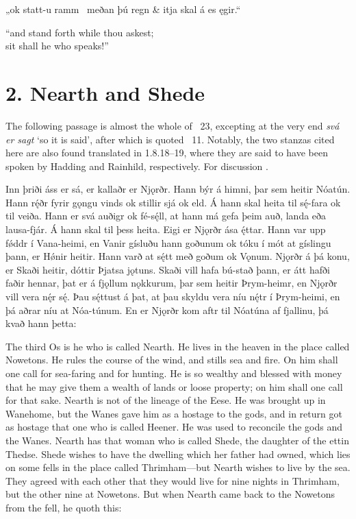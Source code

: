 \bvg\bva„ok statt-u ramm \hld\ meðan þú regn &
\ind {}itja skal á es ęgir.“\eva

\bvb “and stand forth while thou askest; \\
\ind sit shall he who speaks!”\evb\evg

\sectionline

\section{2. Nearth and Shede}\chapterStart

The following passage is almost the whole of \Gylfaginning\ 23, excepting at the very end \emph{svá er sagt} ‘so it is said’, after which is quoted \Grimnismal\ 11.
Notably, the two stanzas cited here are also found translated in \textcite{Saxo} 1.8.18–19, where they are said to have been spoken by Hadding and Rainhild, respectively.  For discussion \textcite{Hopkins2021}.

\bpg\bpa%
Inn þriði áss er sá, er kallaðr er Njǫrðr. Hann býr á himni, þar sem heitir Nóatún. Hann rę́ðr fyrir gǫngu vinds ok stillir sjá ok eld. Á hann skal heita til sę́-fara ok til veiða. Hann er svá auðigr ok fé-sę́ll, at hann má gefa þeim auð, landa eða lausa-fjár. Á hann skal til þess heita. Eigi er Njǫrðr ása ę́ttar. Hann var upp fǿddr í Vana-heimi, en Vanir gísluðu hann goðunum ok tóku í mót at gíslingu þann, er Hǿnir heitir. Hann varð at sę́tt með goðum ok Vǫnum. Njǫrðr á þá konu, er Skaði heitir, dóttir Þjatsa jǫtuns. Skaði vill hafa bú-stað þann, er átt hafði faðir hennar, þat er á fjǫllum nǫkkurum, þar sem heitir Þrym-heimr, en Njǫrðr vill vera nę́r sę́. Þau sę́ttust á þat, at þau skyldu vera níu nę́tr í Þrym-heimi, en þá aðrar níu at Nóa-túnum. En er Njǫrðr kom aftr til Nóatúna af fjallinu, þá kvað hann þetta:\epa

\bpb The third Os is he who is called Nearth. He lives in the heaven in the place called Nowetons.  He rules the course of the wind, and stills sea and fire. On him shall one call for sea-faring and for hunting. He is so wealthy and blessed with money that he may give them a wealth of lands or loose property; on him shall one call for that sake. Nearth is not of the lineage of the Eese. He was brought up in Wanehome, but the Wanes gave him as a hostage to the gods, and in return got as hostage that one who is called Heener. He was used to reconcile the gods and the Wanes. Nearth has that woman who is called Shede, the daughter of the ettin Thedse. Shede wishes to have the dwelling which her father had owned, which lies on some fells in the place called Thrimham—but Nearth wishes to live by the sea. They agreed with each other that they would live for nine nights in Thrimham, but the other nine at Nowetons. But when Nearth came back to the Nowetons from the fell, he quoth this:\epb\epg

